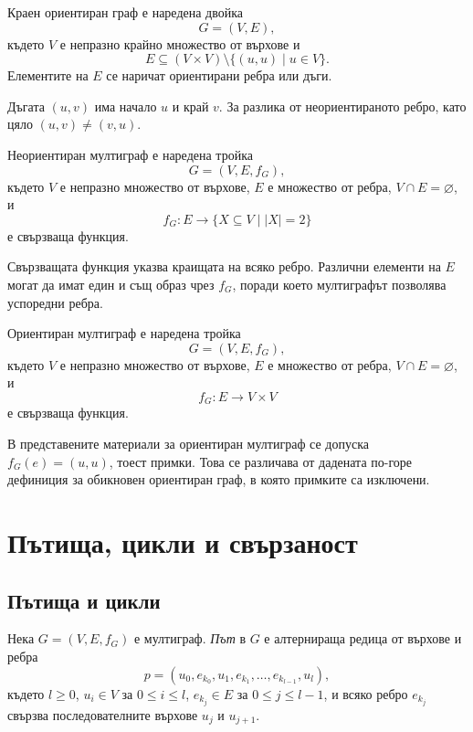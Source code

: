 \begin{defn}
Краен ориентиран граф е наредена двойка
\[
G=(V,E),
\]
където $V$ е непразно крайно множество от върхове и
\[
E\subseteq (V\times V)\setminus\{(u,u)\mid u\in V\}.
\]
Елементите на $E$ се наричат ориентирани ребра или дъги.
\end{defn}

Дъгата $(u,v)$ има начало $u$ и край $v$. За разлика от неориентираното ребро, като цяло $(u,v)\neq(v,u)$.

\begin{defn}
Неориентиран мултиграф е наредена тройка
\[
G=(V,E,f_G),
\]
където $V$ е непразно множество от върхове, $E$ е множество от ребра, $V\cap E=\varnothing$, и
\[
f_G:E\longrightarrow\{X\subseteq V\mid |X|=2\}
\]
е свързваща функция.
\end{defn}

Свързващата функция указва краищата на всяко ребро. Различни елементи на $E$ могат да имат един и същ образ чрез $f_G$, поради което мултиграфът позволява успоредни ребра.

\begin{defn}
Ориентиран мултиграф е наредена тройка
\[
G=(V,E,f_G),
\]
където $V$ е непразно множество от върхове, $E$ е множество от ребра, $V\cap E=\varnothing$, и
\[
f_G:E\longrightarrow V\times V
\]
е свързваща функция.
\end{defn}

\begin{supp}[Бележка]
В представените материали за ориентиран мултиграф се допуска $f_G(e)=(u,u)$, тоест примки. Това се различава от дадената по-горе дефиниция за обикновен ориентиран граф, в която примките са изключени.
\end{supp}

\section{Пътища, цикли и свързаност}\label{s:3.3}

\subsection{Пътища и цикли}\label{s:3.3.1}

\begin{defn}
Нека $G=(V,E,f_G)$ е мултиграф. \emph{Път} в $G$ е алтернираща редица от върхове и ребра
\[
p=(u_0,e_{k_0},u_1,e_{k_1},\ldots,e_{k_{l-1}},u_l),
\]
където $l\geq 0$, $u_i\in V$ за $0\leq i\leq l$, $e_{k_j}\in E$ за $0\leq j\leq l-1$, и всяко ребро $e_{k_j}$ свързва последователните върхове $u_j$ и $u_{j+1}$.
\end{defn}

